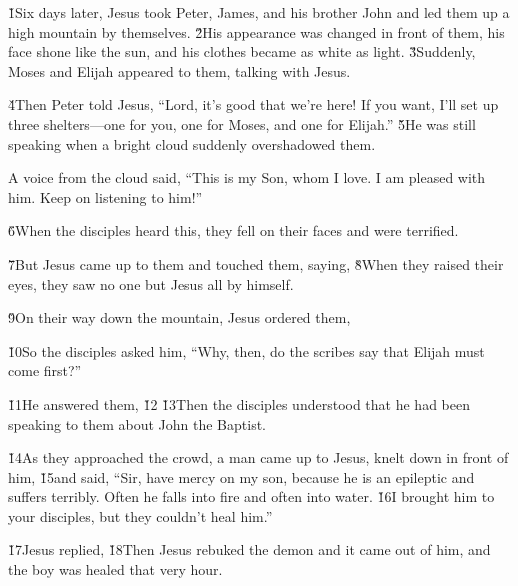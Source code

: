 \v{1}Six days later, Jesus took Peter, James, and his brother John and led them up a high mountain by themselves. \v{2}His appearance was changed in front of them, his face shone like the sun, and his clothes became as white as light. \v{3}Suddenly, Moses and Elijah appeared to them, talking with Jesus.

\v{4}Then Peter told Jesus, ``Lord, it's good that we're here! If you want, I'll set up three shelters---one for you, one for Moses, and one for Elijah.'' \v{5}He was still speaking when a bright cloud suddenly overshadowed them.

A voice from the cloud said, ``This is my Son, whom I love. I am pleased with him. Keep on listening to him!''

\v{6}When the disciples heard this, they fell on their faces and were terrified.

\v{7}But Jesus came up to them and touched them, saying,  \v{8}When they raised their eyes, they saw no one but Jesus all by himself.

\v{9}On their way down the mountain, Jesus ordered them, 

\v{10}So the disciples asked him, ``Why, then, do the scribes say that Elijah must come first?''

\v{11}He answered them,  \v{12}  \v{13}Then the disciples understood that he had been speaking to them about John the Baptist.

\v{14}As they approached the crowd, a man came up to Jesus, knelt down in front of him, \v{15}and said, ``Sir, have mercy on my son, because he is an epileptic and suffers terribly. Often he falls into fire and often into water. \v{16}I brought him to your disciples, but they couldn't heal him.''

\v{17}Jesus replied,  \v{18}Then Jesus rebuked the demon and it came out of him, and the boy was healed that very hour.

